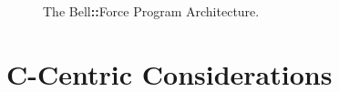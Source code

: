 \documentclass[11pt]{article}
\newcommand{\bellforce}{Bell\hspace*{1.61803398875pt}\textbf{::}\hspace*{1.61803398875pt}Force}
\begin{document}
\begin{figure}[ht]
    \centering
    \caption{The \bellforce{} Program Architecture.}
    \label{fig:flowchart1}
\end{figure}
\section{C-Centric Considerations}
\end{document}
